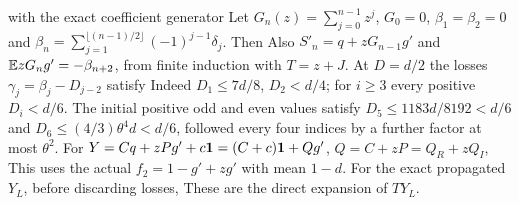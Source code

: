 with the exact coefficient generator
Let $G_n(z)=\allowbreak \sum_{j=\allowbreak 0}^{n-1}z^j$, $G_0=\allowbreak 0$,
$\beta_1=\allowbreak \beta_2=\allowbreak 0$ and
$\beta_n=\allowbreak \sum_{j=\allowbreak 1}^{\lfloor(n-1)/2\rfloor}(-1)^{j-1}\delta_j$.
Then
Also $S'_n=\allowbreak q+zG_{n-1}g'$ and $\mathbb E zG_ng'=\allowbreak -\beta_{n+2}$,
from finite induction with $T=\allowbreak z+J$.
At $D=\allowbreak d/2$ the losses $\gamma_j=\allowbreak \beta_j-D_{j-2}$ satisfy
Indeed $D_1\le\allowbreak 7d/8$, $D_2<\allowbreak d/4$;
for $i\ge\allowbreak 3$ every positive $D_i<\allowbreak d/6$.
The initial positive odd and even values satisfy
$D_5\le\allowbreak 1183d/8192<\allowbreak d/6$ and
$D_6\le\allowbreak (4/3)\theta^4d<\allowbreak d/6$, followed every four indices by a further
factor at most $\theta^2$.
For $Y=\allowbreak Cq+zPg'+c\mathbf1=\allowbreak (C+c)\mathbf1+Qg'$, $Q=\allowbreak C+zP=\allowbreak Q_R+zQ_I$,
This uses the actual $f_2=\allowbreak 1-g'+zg'$ with mean $1-d$.
For the exact propagated $Y_L$, before discarding losses,
These are the direct expansion of $TY_L$.

